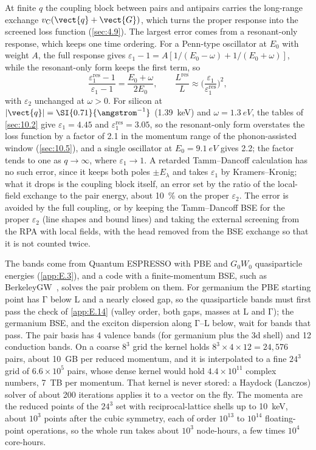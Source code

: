 At finite $q$ the coupling block between pairs and antipairs carries the long-range exchange $v_{\mathrm{C}}(\vect{q}+\vect{G})$, which turns the proper response into the screened loss function (\cref{sec:4.9}). The largest error comes from a resonant-only response, which keeps one time ordering. For a Penn-type oscillator at $E_0$ with weight $A$, the full response gives $\varepsilon_1 - 1 = A[1/(E_0 - \omega) + 1/(E_0 + \omega)]$, while the resonant-only form keeps the first term, so
\begin{equation}
  \frac{\varepsilon_1^{\mathrm{res}} - 1}{\varepsilon_1 - 1} = \frac{E_0 + \omega}{2E_0} , \qquad \frac{L^{\mathrm{res}}}{L} \approx \Big(\frac{\varepsilon_1}{\varepsilon_1^{\mathrm{res}}}\Big)^2 ,
  \label{eq:E.15-tda}
\end{equation}
with $\varepsilon_2$ unchanged at $\omega > 0$. For silicon at $|\vect{q}| = \SI{0.71}{\angstrom^{-1}}$ (\SI{1.39}{keV}) and $\omega = \SI{1.3}{eV}$, the tables of \cref{sec:10.2} give $\varepsilon_1 = 4.45$ and $\varepsilon_1^{\mathrm{res}} = 3.05$, so the resonant-only form overstates the loss function by a factor of 2.1 in the momentum range of the phonon-assisted window (\cref{sec:10.5}), and a single oscillator at $E_0 = \SI{9.1}{eV}$ gives 2.2; the factor tends to one as $q\to\infty$, where $\varepsilon_1\to1$. A retarded Tamm--Dancoff calculation has no such error, since it keeps both poles $\pm E_\lambda$ and takes $\varepsilon_1$ by Kramers--Kronig; what it drops is the coupling block itself, an error set by the ratio of the local-field exchange to the pair energy, about \SI{10}{\percent} on the proper $\varepsilon_2$. The error is avoided by the full coupling, or by keeping the Tamm--Dancoff BSE for the proper $\varepsilon_2$ (line shapes and bound lines) and taking the external screening from the RPA with local fields, with the head removed from the BSE exchange so that it is not counted twice.

The bands come from Quantum ESPRESSO with PBE and $G_0W_0$ quasiparticle energies (\cref{app:E.3}), and a code with a finite-momentum BSE, such as BerkeleyGW~\cite{deslippe2012berkeleygw}, solves the pair problem on them. For germanium the PBE starting point has $\mathrm{\Gamma}$ below L and a nearly closed gap, so the quasiparticle bands must first pass the check of \cref{app:E.14} (valley order, both gaps, masses at L and $\mathrm{\Gamma}$); the germanium BSE, and the exciton dispersion along $\mathrm{\Gamma}$--L below, wait for bands that pass. The pair basis has 4 valence bands (for germanium plus the 3d shell) and 12 conduction bands. On a coarse $8^3$ grid the kernel holds $8^3\times4\times12 = 24{,}576$ pairs, about \SI{10}{GB} per reduced momentum, and it is interpolated to a fine $24^3$ grid of $6.6\times10^5$ pairs, whose dense kernel would hold $4.4\times10^{11}$ complex numbers, \SI{7}{TB} per momentum. That kernel is never stored: a Haydock (Lanczos) solver of about 200 iterations applies it to a vector on the fly. The momenta are the reduced points of the $24^3$ set with reciprocal-lattice shells up to \SI{10}{keV}, about $10^3$ points after the cubic symmetry, each of order $10^{13}$ to $10^{14}$ floating-point operations, so the whole run takes about $10^3$ node-hours, a few times $10^4$ core-hours.

